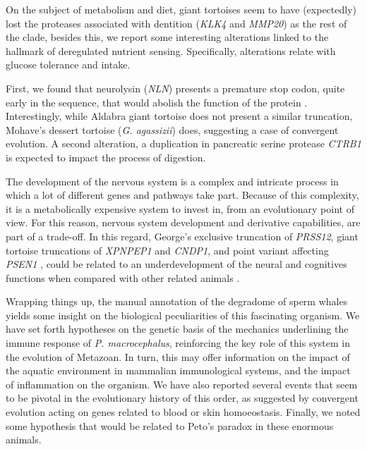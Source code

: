 On the subject of metabolism and diet, giant tortoises seem to have (expectedly) lost the proteases associated with dentition (\textit{KLK4} and \textit{MMP20}) as the rest of the clade, besides this, we report some interesting alterations linked to the hallmark of deregulated nutrient sensing.
Specifically, alterations relate with glucose tolerance and intake.

First, we found that neurolysin (\textit{NLN}) presents a premature stop codon, quite early in the sequence, that would abolish the function of the protein%
.
Interestingly, while Aldabra giant tortoise does not present a similar truncation, Mohave's dessert tortoise (\textit{G. agassizii}) does, suggesting a case of convergent evolution.
A second alteration, a duplication in pancreatic serine protease \textit{CTRB1} %
is expected to impact the process of digestion.

The development of the nervous system is a complex and intricate process in which a lot of different genes and pathways take part.
Because of this complexity, it is a metabolically expensive system to invest in, from an evolutionary point of view.
For this reason, nervous system development and derivative capabilities, are part of a trade-off.
In this regard, George's exclusive truncation of \textit{PRSS12}, giant tortoise truncations of \textit{XPNPEP1} and \textit{CNDP1}, and point variant affecting \textit{PSEN1}%
, could be related to an underdevelopment of the neural and cognitives functions when compared with other related animals \cite{Bellia2014,Jiang2015,Mitsui2013,Yoon2012}.

Wrapping things up, the manual annotation of the degradome of sperm whales yields some insight on the biological peculiarities of this fascinating organism.
We have set forth hypotheses on the genetic basis of the mechanics underlining the immune response of \textit{P. macrocephalus}, reinforcing the key role of this system in the evolution of Metazoan.
In turn, this may offer information on the impact of the aquatic environment in mammalian immunological systems, and the impact of inflammation on the organism.
We have also reported several events that seem to be pivotal in the evolutionary history of this order, as suggested by convergent evolution acting on genes related to blood or skin homoeostasis.
Finally, we noted some hypothesis that would be related to Peto's paradox in these enormous animals.


